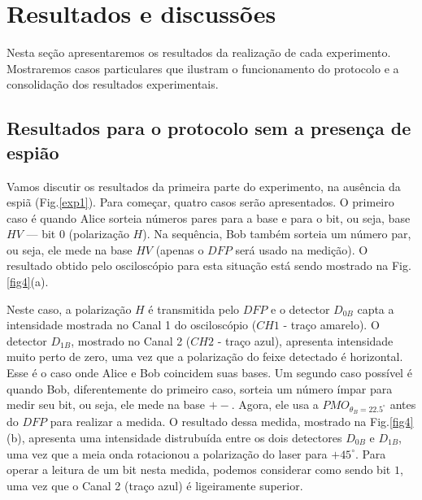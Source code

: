 \documentclass[pra, twocolumn]{revtex4}
\begin{document}
\section{Resultados e discuss\~oes}

Nesta se\c c\~ao apresentaremos os resultados da realiza\c c\~ao de cada experimento. Mostraremos casos particulares que ilustram o funcionamento do protocolo e a consolida\c c\~ao dos resultados experimentais. 

\subsection{Resultados para o protocolo sem a presen\c ca de espi\~ao}
\label{resultSemEva}

 Vamos discutir os resultados da primeira parte do experimento, na aus\^encia da espi\~a (Fig.\ref{exp1}). Para come\c car, quatro casos ser\~ao apresentados. O primeiro caso \'e quando Alice sorteia n\'umeros pares para a base e para o bit, ou seja, base $HV$ --- bit $0$ (polariza\c c\~ao $H$). Na sequ\^encia, Bob tamb\'em sorteia um n\'umero par, ou seja, ele mede na base $HV$ (apenas o $DFP$ ser\'a usado na medi\c c\~ao). O resultado obtido pelo oscilosc\'opio para esta situa\c c\~ao est\'a sendo mostrado na Fig.\ref{fig4}(a).

Neste caso, a polariza\c c\~ao $H$ \'e transmitida pelo $DFP$ e o detector $D_{0B}$ capta a intensidade mostrada no Canal 1 do oscilosc\'opio  ($CH1$ - tra\c co amarelo). O detector $D_{1B}$, mostrado no Canal 2 ($CH2$ - tra\c co azul), apresenta intensidade muito perto de zero, uma vez que a polariza\c c\~ao do feixe detectado \'e horizontal. Esse \'e o caso onde Alice e Bob coincidem suas bases. Um segundo caso  poss\'ivel \'e quando Bob, diferentemente do primeiro caso, sorteia um n\'umero \'impar para medir seu bit, ou seja, ele mede na base $+-$. Agora, ele usa a  $PMO_{\theta_B=22.5^\circ}$ antes do $DFP$ para realizar a medida. O resultado dessa medida, mostrado na Fig.\ref{fig4}(b),  apresenta uma intensidade distrubu\'ida entre os dois detectores $D_{0B}$ e $D_{1B}$, uma vez que a meia onda rotacionou a polariza\c c\~ao do laser para $+45^\circ$. Para operar a leitura de um bit nesta medida, podemos considerar como sendo bit $1$, uma vez que o Canal 2 (tra\c co azul) \'e ligeiramente superior.  
\end{document}
